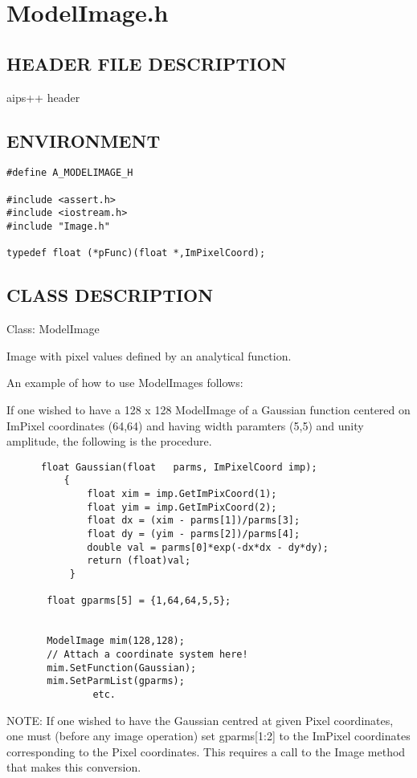 \clearpage
\section{ModelImage.h}

\subsection*{HEADER FILE DESCRIPTION}
 aips++ header
  
\subsection*{ENVIRONMENT}
\begin{verbatim}
#define A_MODELIMAGE_H

#include <assert.h>
#include <iostream.h>
#include "Image.h"

typedef float (*pFunc)(float *,ImPixelCoord);
\end{verbatim}

\subsection*{CLASS DESCRIPTION}
   Class: ModelImage
  
   Image with pixel values defined by an analytical function.
  
   An example of how to use ModelImages follows:
  
   If one wished to have a 128 x 128 ModelImage of a Gaussian function 
   centered on ImPixel coordinates (64,64) and having width paramters
   (5,5) and unity amplitude, the following is the procedure.
  
\begin{verbatim}
      float Gaussian(float   parms, ImPixelCoord imp);
          {
              float xim = imp.GetImPixCoord(1);
              float yim = imp.GetImPixCoord(2);
              float dx = (xim - parms[1])/parms[3];
              float dy = (yim - parms[2])/parms[4];
              double val = parms[0]*exp(-dx*dx - dy*dy);
              return (float)val;
           }
  
       float gparms[5] = {1,64,64,5,5};
  
  
       ModelImage mim(128,128);
       // Attach a coordinate system here!
       mim.SetFunction(Gaussian);
       mim.SetParmList(gparms);
               etc.
\end{verbatim}  
   NOTE: If one wished to have the Gaussian centred at given Pixel coordinates,
   one must (before any image operation) set gparms[1:2] to the ImPixel
   coordinates corresponding to the Pixel coordinates. This requires a call to 
   the Image method that makes this conversion.
  
